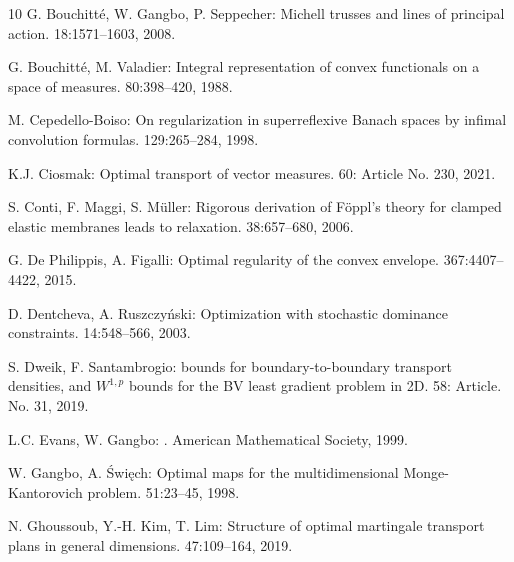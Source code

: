 \documentclass[11pt,letterpaper,reqno]{amsart}
\theoremstyle{definition}
\numberwithin{equation}{section}
\begin{document}
{\begin{thebibliography}{10}
	G. Bouchitt{\'e}, W. Gangbo, P. Seppecher:
	\newblock Michell trusses and lines of principal action.
	18:1571--1603, 2008.

	G. Bouchitt{\'e}, M. Valadier:
	\newblock Integral representation of convex functionals on a space of measures.
	80:398--420, 1988.

        
	M. Cepedello-Boiso:
	\newblock On regularization in superreflexive Banach spaces by infimal convolution formulas.
	 129:265--284, 1998.
	
	
	K.J. Ciosmak:
	\newblock Optimal transport of vector measures.  60: Article No. 230, 2021.
	
	S. Conti, F. Maggi, S. M{\"u}ller:
	\newblock Rigorous derivation of {F}{\"o}ppl’s theory for clamped elastic
	membranes leads to relaxation.
	 38:657--680, 2006.


	G. De Philippis, A. Figalli: 
	\newblock Optimal regularity of the convex envelope.
	 367:4407--4422, 2015.
    
	D. Dentcheva, A. Ruszczy\'{n}ski:
	\newblock Optimization with stochastic dominance constraints.
	 14:548--566, 2003.
	
	S. Dweik, F. Santambrogio:
	 bounds for boundary-to-boundary transport densities, and
	{$W^{1,p}$} bounds for the {BV} least gradient problem in 2{D}.
	 58: Article. No. 31,
	2019.

	L.C. Evans, W. Gangbo:
	.
	\newblock American Mathematical Society, 1999.
	
	W. Gangbo, A. Święch:
	\newblock Optimal maps for the multidimensional Monge-Kantorovich problem.
	  51:23--45, 1998.
    
	N. Ghoussoub, Y.-H. Kim, T. Lim:
	\newblock Structure of optimal martingale transport plans in general
	dimensions.
	 47:109--164, 2019.
	

\end{thebibliography}}
\end{document}
